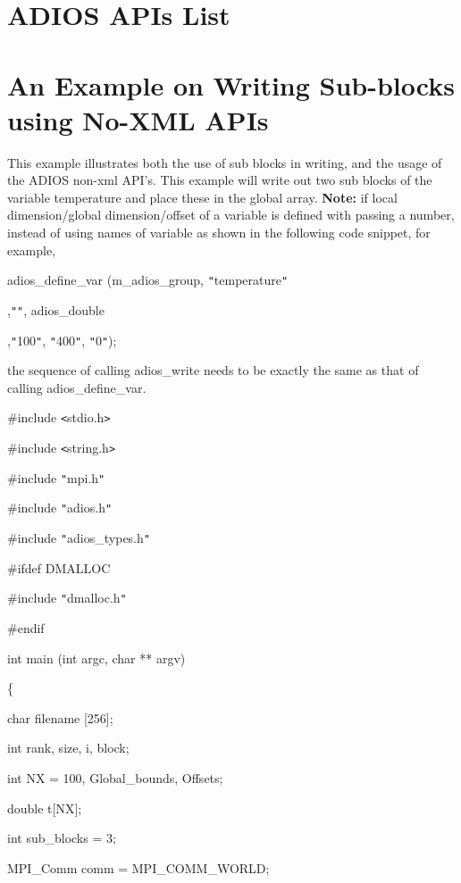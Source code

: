 \section{ADIOS APIs List}



\section{An Example on Writing Sub-blocks using No-XML APIs}

This example illustrates both the use of sub blocks in writing, and the usage of 
the ADIOS non-xml API's. This example will write out two sub blocks of the variable 
temperature and place these in the global array. \textbf{Note:} if local dimension/global 
dimension/offset of a variable is defined with passing a number, instead of using 
names of variable as shown in the following code snippet, for example,

adios\_define\_var (m\_adios\_group, \texttt{"}temperature\texttt{"}

\parindent=86pt
,\texttt{"}\texttt{"}, adios\_double

,\texttt{"}100\texttt{"}, \texttt{"}400\texttt{"}, \texttt{"}0\texttt{"});

\parindent=0pt
the sequence of calling adios\_write needs to be exactly the same as that of calling 
adios\_define\_var.

\#include \texttt{<}stdio.h\texttt{>}

\#include \texttt{<}string.h\texttt{>}

\#include \texttt{"}mpi.h\texttt{"}

\#include \texttt{"}adios.h\texttt{"}

\#include \texttt{"}adios\_types.h\texttt{"}

\#ifdef DMALLOC

\#include \texttt{"}dmalloc.h\texttt{"}

\#endif

int main (int argc, char ** argv)

\{

\parindent=28pt
char        filename [256];

int         rank, size, i, block;

\parindent=57pt
int         NX = 100, Global\_bounds, Offsets;

\parindent=28pt
double      t[NX];

int         sub\_blocks = 3;

\parindent=57pt
MPI\_Comm    comm = MPI\_COMM\_WORLD;

